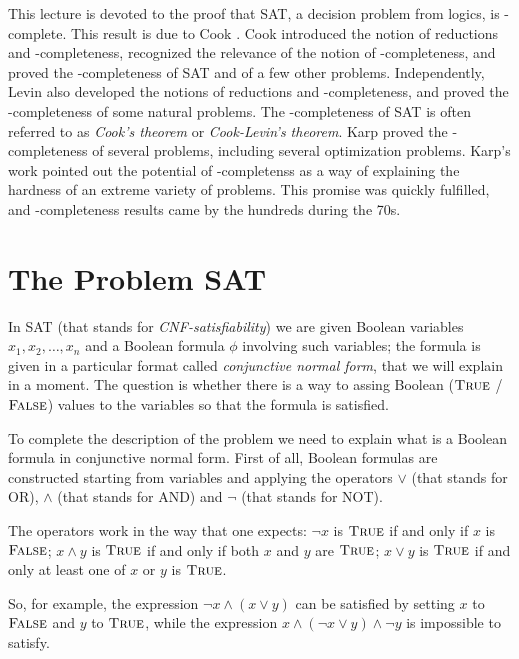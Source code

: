 







This lecture is devoted to the proof that SAT, a decision
problem from logics, is \np-complete. This result
is due to Cook \cite{C71}. Cook introduced the notion
of reductions and \np-completeness, recognized the
relevance of the notion of \np-completeness, and proved
the \np-completeness of SAT and of a few other problems.
Independently, Levin \cite{L73} also developed the notions
of reductions and \np-completeness, and proved
the \np-completeness of some natural problems. The
\np-completeness of SAT is often referred to as
{\em Cook's theorem} or {\em Cook-Levin's theorem}.
Karp \cite{K72}  proved the \np-completeness
of several problems, including several optimization
problems. Karp's work pointed out the potential of
\np-completenss as a way of explaining the hardness of
an extreme variety of problems. This promise was quickly
fulfilled, and \np-completeness results came by the
hundreds during the 70s.

\section{The Problem SAT}

In SAT (that stands for {\em CNF-satisfiability}) we are
given Boolean variables $x_1,x_2,\ldots,x_n$ and a 
Boolean formula $\phi$ involving such variables; the formula
is given in a particular format called {\em conjunctive
normal form}, that we will explain in a moment.
The question is whether there is a way to assing Boolean
($\mbox{\sc True}$ / $\mbox{\sc False}$) values to the variables so that the
formula is satisfied.

To complete the description of the problem we need
to explain what is a Boolean formula in conjunctive
normal form. First of all, Boolean formulas are
constructed starting from variables and
applying the operators $\vee$ (that stands for OR),
$\wedge$ (that stands for AND) and $\neg$ (that stands
for NOT).

The operators work in the way that one expects:
$\neg x$ is $\mbox{\sc True}$ if and only if $x$ is $\mbox{\sc False}$; $x\wedge y$
is $\mbox{\sc True}$ if and only if both $x$ and $y$ are $\mbox{\sc True}$;
$x \vee y$ is $\mbox{\sc True}$ if and only at least one of $x$ or $y$
is $\mbox{\sc True}$.

So, for example, the expression $\neg x \wedge (x \vee y)$
can be satisfied by setting $x$ to $\mbox{\sc False}$ and $y$ to $\mbox{\sc True}$,
while the expression $x \wedge (\neg x \vee y) \wedge \neg y$
is impossible to satisfy.

